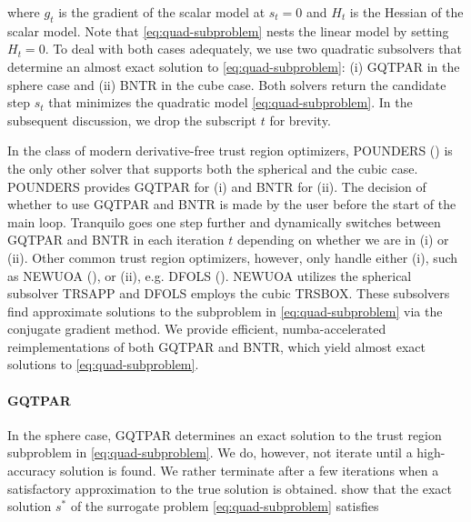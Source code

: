 \noindent where $g_t$ is the gradient of the scalar model at $s_t = 0$ and $H_t$ is the Hessian of the scalar model.
Note that \ref{eq:quad-subproblem} nests the linear model by setting $H_t=0$.
To deal with both cases adequately, we use two quadratic subsolvers that determine an almost exact solution to \ref{eq:quad-subproblem}: (i) GQTPAR in the sphere case and (ii) BNTR in the cube case.
Both solvers return the candidate step $s_t$ that minimizes the quadratic model \ref{eq:quad-subproblem}. In the subsequent discussion, we drop the subscript $t$ for brevity.

In the class of modern derivative-free trust region optimizers, POUNDERS (\cite{Wild2015}) is the only other solver that supports both the spherical and the cubic case. POUNDERS provides GQTPAR for (i) and BNTR for (ii). The decision of whether to use GQTPAR and BNTR is made by the user before the start of the main loop. Tranquilo goes one step further and dynamically switches between GQTPAR and BNTR in each iteration $t$ depending on whether we are in (i) or (ii). Other common trust region optimizers, however, only handle either (i), such as NEWUOA (\cite{newuoa2006}), or (ii), e.g. DFOLS (\cite{dfols2019}). NEWUOA utilizes the spherical subsolver TRSAPP and DFOLS employs the cubic TRSBOX. These subsolvers find approximate solutions to the subproblem in \ref{eq:quad-subproblem} via the conjugate gradient method.
We provide efficient, numba-accelerated reimplementations of both GQTPAR and BNTR, which yield almost exact solutions to \ref{eq:quad-subproblem}.



\paragraph{GQTPAR}

In the sphere case, GQTPAR determines an exact solution to the trust region
subproblem in \ref{eq:quad-subproblem}. We do, however, not iterate until a high-accuracy solution is found. We rather terminate after a few iterations when a satisfactory approximation to the true solution is obtained. \cite{More1983} show that the exact solution $s^*$ of the surrogate problem \ref{eq:quad-subproblem} satisfies

